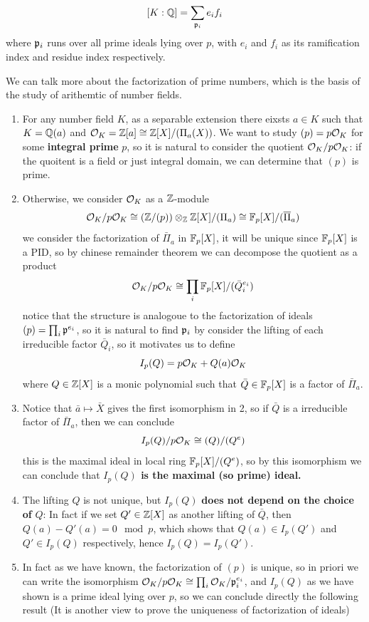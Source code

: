 \begin{colorcorollary}
    \[[K:\mathbb{Q}] = \sum_{\mathfrak{p}_i} e_if_i \]
    where \(\mathfrak{p}_i\) runs over all prime ideals lying over \(p\), with \(e_i\) and \(f_i\) as its ramification index and residue index respectively.
\end{colorcorollary}

We can talk more about the factorization of prime numbers, which is the basis of the study of arithemtic of number fields.

\begin{enumerate}
    \item For any number field \(K\), as a separable extension there eixsts \(a \in K\) such that \(K = \mathbb{Q}(a)\) and \(\mathcal{O}_K = \mathbb{Z}[a] \cong \mathbb{Z}[X]/(\Pi_a(X))\). We want to study \((p) = p\mathcal{O}_K\) for some \textbf{integral prime} \(p\), so it is natural to consider the quotient \(\mathcal{O}_K/p\mathcal{O}_K\): if the quoitent is a field or just integral domain, we can determine that \((p)\) is prime.

    \item Otherwise, we consider \(\mathcal{O}_K\) as a \(\mathbb{Z}\)-module
    \[\mathcal{O}_K/p\mathcal{O}_K \cong (\mathbb{Z}/(p)) \otimes_{\mathbb{Z}} \mathbb{Z}[X]/(\Pi_a) \cong \mathbb{F}_p[X]/(\overline{\Pi}_a)\]
    we consider the factorization of \(\bar{\Pi}_a\) in \(\mathbb{F}_p[X]\), it will be unique since \(\mathbb{F}_p[X]\) is a PID, so by chinese remainder theorem we can decompose the quotient as a product 
    \[\mathcal{O}_K/p\mathcal{O}_K \cong \prod_{i}\mathbb{F}_p[X]/(\bar{Q}_i^{e_{i}})\]
    notice that the structure is analogoue to the factorization of ideals \((p) = \prod_i \mathfrak{p}^{e_i}\), so it is natural to find \(\mathfrak{p}_i\) by consider the lifting of each irreducible factor \(\bar{Q}_i\), so it motivates us to define
    \[I_p(Q) = p\mathcal{O}_K + Q(a)\mathcal{O}_K\]
    where \(Q \in \mathbb{Z}[X]\) is a monic polynomial such that \(\bar{Q} \in \mathbb{F}_p[X]\) is a factor of \(\bar{\Pi}_a\).

    \item Notice that \(\bar{a} \mapsto \bar{X}\) gives the first isomorphism in 2, so if \(\bar{Q}\) is a irreducible factor of \(\bar{\Pi}_a\), then  we can conclude  \[I_p(Q)/p\mathcal{O}_K \cong (Q)/(Q^{e})\] this is the maximal ideal in local ring \(\mathbb{F}_p[X]/(Q^{e})\), so by this isomorphism we can conclude that \textbf{\(I_p(Q)\) is the maximal (so prime) ideal.}
    
    \item The lifting \(Q\) is not unique, but \(I_p(Q)\) \textbf{does not depend on the choice of} \(Q\): In fact if we set \(Q' \in \mathbb{Z}[X]\) as another lifting of \(\bar{Q}\), then \(Q(a) - Q'(a) = 0 \mod p\), which shows that \(Q(a) \in I_p(Q')\) and \(Q' \in I_p(Q)\) respectively, hence \(I_p(Q) = I_p(Q')\).
    
    \item In fact as we have known, the factorization of \((p)\) is unique, so in priori we can write the isomorphism \(\mathcal{O}_K/p\mathcal{O}_K \cong \prod_{i} \mathcal{O}_K/\mathfrak{p}_i^{e_i}\), and \(I_p(Q)\) as we have shown is a prime ideal lying over \(p\), so we can conclude directly the following result (It is another view to prove the uniqueness of factorization of ideals)
\end{enumerate}


